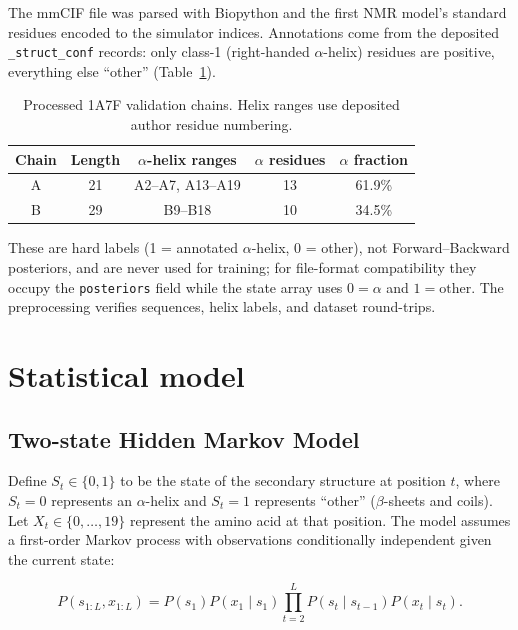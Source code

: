 \documentclass[12pt]{article}
\begin{document}
The mmCIF file was parsed with Biopython and the first NMR model's standard
residues encoded to the simulator indices. Annotations come from the deposited
\texttt{\_struct\_\allowbreak conf} records: only class-1 (right-handed
$\alpha$-helix)
residues are positive, everything else ``other'' (Table~\ref{tab:insulin-data}).

\begin{table}[ht]
    \centering
    \caption{Processed 1A7F validation chains. Helix ranges use deposited author residue numbering.}
    \label{tab:insulin-data}
    \begin{tabular}{c|c|c|c|c}
        \hline
        Chain & Length & $\alpha$-helix ranges & $\alpha$ residues & $\alpha$ fraction \\
        \hline
        A & 21 & A2--A7, A13--A19 & 13 & 61.9\% \\
        B & 29 & B9--B18 & 10 & 34.5\% \\
        \hline
    \end{tabular}
\end{table}

These are hard labels (1 = annotated $\alpha$-helix, 0 = other), not
Forward--Backward posteriors, and are never used for training; for file-format
compatibility they occupy the \texttt{posteriors} field while the
state array uses $0=\alpha$ and $1=\text{other}$. The preprocessing verifies
sequences, helix labels, and dataset round-trips.

\section{Statistical model}
\label{sec:stat}

\subsection{Two-state Hidden Markov Model}

Define $S_t\in\{0,1\}$ to be the state of the secondary structure at position $t$, where $S_t=0$ represents an $\alpha$-helix and $S_t=1$ represents ``other'' ($\beta$-sheets and coils). Let $X_t\in\{0,\ldots,19\}$ represent the amino acid at that position. The model assumes a first-order Markov process with observations conditionally independent given the current state:

\begin{equation}
P(s_{1:L},x_{1:L})
= P(s_1)P(x_1\mid s_1)
  \prod_{t=2}^{L} P(s_t\mid s_{t-1})P(x_t\mid s_t).
\label{eq:hmm-joint}
\end{equation}
\end{document}
